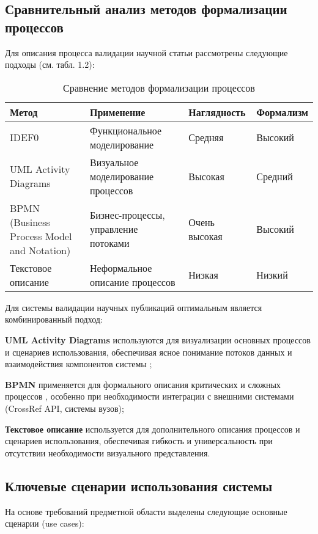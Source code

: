 \subsection{Сравнительный анализ методов формализации процессов}
Для описания процесса валидации научной статьи рассмотрены следующие подходы (см. табл. 1.2):

\begin{table}[h]
	\caption{Сравнение методов формализации процессов}
	\label{tab:process-formalization-methods}
	\centering
	\begin{tabular}{|p{}|p{}|p{}|p{}|}
		\hline
		Метод & Применение & Наглядность & Формализм \\
		\hline
		IDEF0 & Функциональное моделирование & Средняя & Высокий \\
		\hline
		UML Activity Diagrams & Визуальное моделирование процессов & Высокая & Средний \\
		\hline
		BPMN (Business Process Model and Notation) & Бизнес-процессы, управление потоками & Очень высокая & Высокий \\
		\hline
		Текстовое описание & Неформальное описание процессов & Низкая & Низкий \\
		\hline
	\end{tabular}
\end{table}

Для системы валидации научных публикаций оптимальным является комбинированный подход:

\begin{compactenum}
	\item \textbf{UML Activity Diagrams} используются для визуализации основных процессов 
	и сценариев использования, обеспечивая ясное понимание потоков данных и взаимодействия
	компонентов системы \cite{uml,business-laguna, cognitive-systems-research};
	\item \textbf{BPMN} применяется для формального описания критических и сложных процессов \cite{business-laguna,cognitive-systems-research,info-tech},
	особенно при необходимости интеграции с внешними системами (CrossRef API, системы вузов);
	\item \textbf{Текстовое описание} используется для дополнительного описания процессов и сценариев использования,
	обеспечивая гибкость и универсальность при отсутствии необходимости визуального представления.
\end{compactenum}

\subsection{Ключевые сценарии использования системы}
На основе требований предметной области выделены следующие основные сценарии (use cases):



